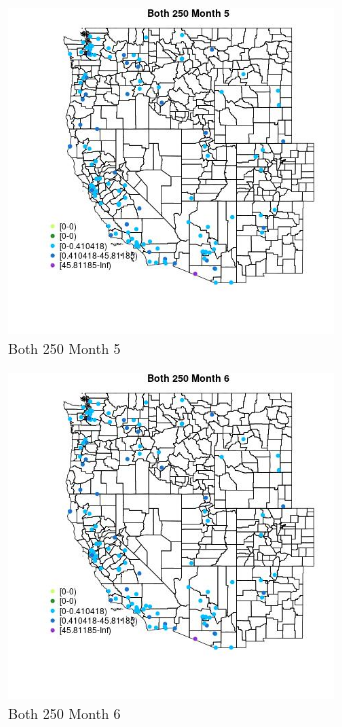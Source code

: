 \begin{figure} 
\centering  
\includegraphics[width=0.77\textwidth]{Code_Outputs/Report_ML_input_PM25_Step4_part_e_de_duplicated_aves_MapObsMo5Both_250.jpg} 
\caption{\label{fig:Report_ML_input_PM25_Step4_part_e_de_duplicated_avesMapObsMo5Both_250}Both 250 Month 5} 
\end{figure} 
 

\begin{figure} 
\centering  
\includegraphics[width=0.77\textwidth]{Code_Outputs/Report_ML_input_PM25_Step4_part_e_de_duplicated_aves_MapObsMo6Both_250.jpg} 
\caption{\label{fig:Report_ML_input_PM25_Step4_part_e_de_duplicated_avesMapObsMo6Both_250}Both 250 Month 6} 
\end{figure} 
 

